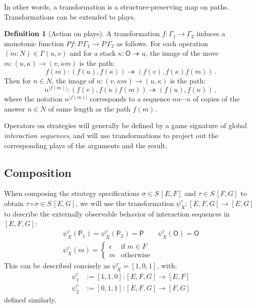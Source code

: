 \documentclass[11pt,oneside,draft]{book}
\theoremstyle{definition}
\newtheorem{definition}[theorem]{Definition}
\newcommand{\kw}[1]{\ensuremath{ \mathsf{#1} }}
\begin{document}
In other words,
a transformation
is a structure-preserving map on paths.
Transformations can be extended to plays.

\begin{definition}[Action on plays]
A transformation
$f : \Gamma_1 \rightarrow \Gamma_2$
induces a monotonic function
$P f  : P \, \Gamma_1 \rightarrow P \, \Gamma_2$
as follows.
For each operation $(m \mathbin: N) \in \Gamma(u, v)$
and for a stack $\kappa : \kw{O} \twoheadrightarrow u$,
the image of the move
$m : (u, \kappa) \rightarrow (v, \kappa m)$
is the path:
\[
 f(m) : (f(u), f(\kappa)) \twoheadrightarrow
        (f(v), f(\kappa) f(m)) \,.
\]
Then for $n \in N$,
the image of
$n : (v, \kappa m) \rightarrow (u, \kappa)$
is the path:
\[
 n^{|f(m)|} : (f(v), f(\kappa) f(m)) \twoheadrightarrow
              (f(u), f(\kappa)) \,,
\]
where the notation $n^{|f(m)|}$
corresponds to a sequence $nn \cdots n$
of copies of the answer $n \in N$
of same length as the path $f(m)$.
\end{definition}

Operators on strategies will generally be defined
by a game signature of global \emph{interaction sequences},
and will use transformations to project out
the corresponding plays of the arguments and the result.

\subsection{Composition} %

When composing the strategy specifications
$\sigma \in S \, [E, F]$ and
$\tau \in S \, [F, G]$
to obtain $\tau \circ \sigma \in S \, [E, G]$,
we will use the transformation
$\psi^c_X : [E,F,G] \rightarrow [E,G]$
to describe the externally observable behavior
of interaction sequences in $[E,F,G]$:
\begin{gather*}
  \psi^c_X(\kw{P}_1) = \psi^c_X(\kw{P}_2) = \kw{P} \qquad
  \psi^c_X(\kw{O}) = \kw{O}
  \\
  \psi^c_X(m) = \begin{cases}
    \epsilon & \text{if } m \in F \\
    m & \text{otherwise}
  \end{cases}
\end{gather*}
This can be described concisely as
$\psi^c_X = [1,0,1]$,
with:
\begin{align*}
  \psi^c_1 &:= [1,1,0] :
    [E,F,G] \rightarrow [E,F] \\
  \psi^c_2 &:= [0,1,1] :
     [E,F,G] \rightarrow [F,G]
\end{align*}
defined similarly.
\end{document}
